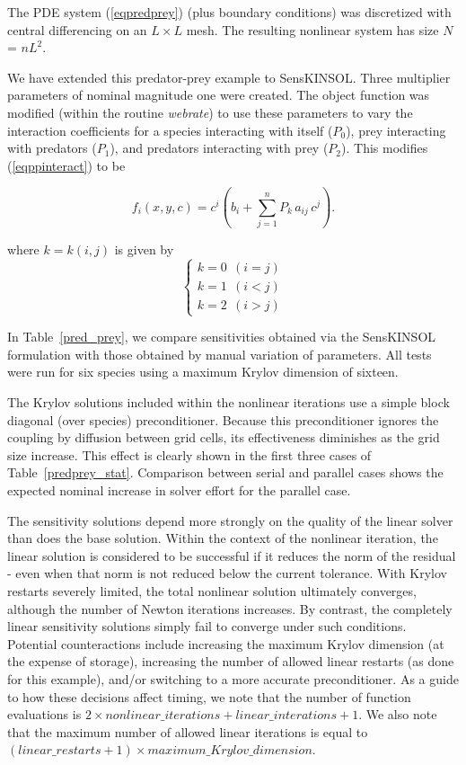 \documentclass[11pt]{article}
\begin{document}
The PDE system (\ref{eqpredprey}) (plus boundary conditions) was
discretized with central differencing on an $L \times L$ mesh. The
resulting nonlinear system has size $N$ = $n L^2$.

We have extended this predator-prey example to SensKINSOL. Three
multiplier parameters of nominal magnitude one were created. The object
function was modified (within the routine \mbox{\em webrate}) to use
these parameters to vary the interaction coefficients for a species
interacting with itself ($P_0$), prey interacting with predators
($P_1$), and predators interacting with prey ($P_2$). This modifies
(\ref{eqppinteract}) to be

\begin{equation}
f_i(x,y,c) = c^i (b_i + \sum_{j = 1}^n P_k \, a_{ij} \, c^j).
\end{equation}

where $k = k(i,j)$ is given by
\begin{equation}
\left\{
\begin{array}{l}
k = 0 ~~ (i = j) \\
k = 1 ~~ (i < j) \\
k = 2 ~~ (i > j)
\end{array}
\right.
\end{equation}

In \mbox{Table \ref{pred_prey}}, we compare sensitivities obtained via
the SensKINSOL formulation with those obtained by manual variation of
parameters. All tests were run for six species using a maximum Krylov
dimension of sixteen.

The Krylov solutions included within the nonlinear iterations use a
simple block diagonal (over species) preconditioner. Because this
preconditioner ignores the coupling by diffusion between grid cells,
its effectiveness diminishes as the grid size increase. This effect is
clearly shown in the first three cases of \mbox{Table
\ref{predprey_stat}}. Comparison between serial and parallel cases
shows the expected nominal increase in solver effort for the parallel
case.

The sensitivity solutions depend more strongly on the quality of the
linear solver than does the base solution. Within the context of the
nonlinear iteration, the linear solution is considered to be successful
if it reduces the norm of the residual - even when that norm is not
reduced below the current tolerance. With Krylov restarts severely
limited, the total nonlinear solution ultimately converges, although
the number of Newton iterations increases. By contrast, the completely
linear sensitivity solutions simply fail to converge under such
conditions. Potential counteractions include increasing the maximum
Krylov dimension (at the expense of storage), increasing the number of
allowed linear restarts (as done for this example), and/or switching to
a more accurate preconditioner. As a guide to how these decisions
affect timing, we note that the number of function evaluations is
$2 \times nonlinear\_iterations + linear\_interations + 1$. We also
note that the maximum number of allowed linear iterations is equal to
$(linear\_restarts + 1) \times maximum\_Krylov\_dimension$.
\end{document}
